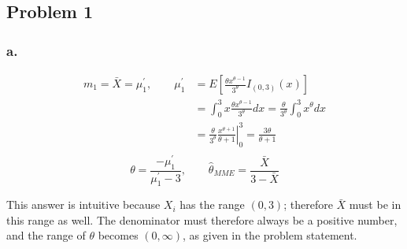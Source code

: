 \documentclass{article}
\begin{document}
\setlength{\headheight}{4\baselineskip}



\subsection*{Problem 1}
\subsubsection*{a.}

\begin{align*}
m_1 = \bar{X} = \mu_1^\prime,\quad\quad \mu_1^\prime &= E\left[\frac{\theta x^{\theta-1}}{3^{\theta}}I_{(0,3)}(x)\right] \\
&=\int_0^3 x\frac{\theta x^{\theta-1}}{3^{\theta}}dx = \frac{\theta}{3^\theta}\int^3_0x^\theta dx \\
&=\frac{\theta}{3^\theta}\left.\frac{x^{\theta+1}}{\theta+1}\right|^3_0 = \frac{3\theta}{\theta+1} \\
\end{align*}
\[\theta = \frac{-\mu_1^\prime}{\mu_1^\prime-3},\quad\quad \hat{\theta}_{MME} = \frac{\bar{X}}{3-\bar{X}}\]

This answer is intuitive because $X_i$ has the range $(0,3)$; therefore $\bar{X}$ must be in this range as well. The denominator must therefore always be a positive number, and the range of $\theta$ becomes $(0,\infty)$, as given in the problem statement.
\end{document}
